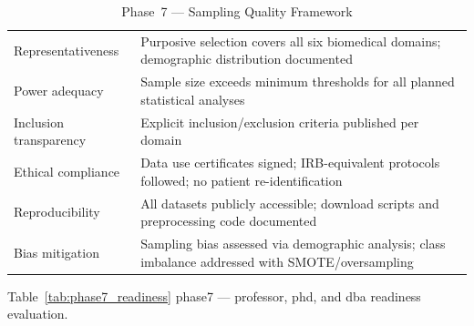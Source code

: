 \begin{xltabular}{\textwidth}{@{} l X @{}}
\caption{Phase~7 --- Sampling Quality Framework}
\label{tab:phase7_quality}\\
\toprule
{} &  \\
\midrule
\endfirsthead
\endhead
\bottomrule
\endlastfoot
Representativeness     & Purposive selection covers all six biomedical domains; demographic distribution documented \\
\addlinespace
Power adequacy         & Sample size exceeds minimum thresholds for all planned statistical analyses \\
\addlinespace
Inclusion transparency & Explicit inclusion/exclusion criteria published per domain \\
\addlinespace
Ethical compliance     & Data use certificates signed; IRB-equivalent protocols followed; no patient re-identification \\
\addlinespace
Reproducibility        & All datasets publicly accessible; download scripts and preprocessing code documented \\
\addlinespace
Bias mitigation        & Sampling bias assessed via demographic analysis; class imbalance addressed with SMOTE/oversampling \\
\end{xltabular}
\endgroup

\vspace{1.5em}

\begingroup\singlespacing\tablefontsize\tablestripes
\noindent Table~\ref{tab:phase7_readiness} phase7 --- professor, phd, and dba readiness evaluation.

